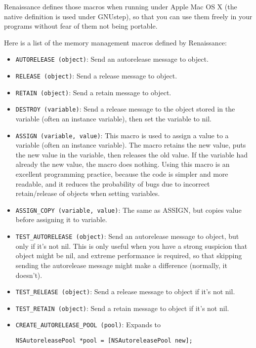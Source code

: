 Renaissance defines those macros when running under Apple Mac OS X
(the native definition is used under GNUstep), so that you can use
them freely in your programs without fear of them not being portable.

Here is a list of the memory management macros defined by Renaissance:
\begin{itemize}
\item \texttt{AUTORELEASE (object)}: Send an autorelease message to object.
\item \texttt{RELEASE (object)}: Send a release message to object.
\item \texttt{RETAIN (object)}: Send a retain message to object.
\item \texttt{DESTROY (variable)}: Send a release message to the object
stored in the variable (often an instance variable), then set the
variable to nil.
\item \texttt{ASSIGN (variable, value)}: This macro is used to assign a 
value to a variable (often an instance variable).  The macro retains
the new value, puts the new value in the variable, then releases the
old value.  If the variable had already the new value, the macro does
nothing.  Using this macro is an excellent programming practice,
because the code is simpler and more readable, and it reduces the
probability of bugs due to incorrect retain/release of objects when
setting variables.
\item \texttt{ASSIGN\_COPY (variable, value)}: The same as ASSIGN, but copies
value before assigning it to variable.
\item \texttt{TEST\_AUTORELEASE (object)}: Send an autorelease message to
object, but only if it's not nil.  This is only useful when you have a
strong suspicion that object might be nil, and extreme performance is
required, so that skipping sending the autorelease message might make
a difference (normally, it doesn't).
\item \texttt{TEST\_RELEASE (object)}: Send a release message to
object if it's not nil.
\item \texttt{TEST\_RETAIN (object)}: Send a retain message to
object if it's not nil.
\item \texttt{CREATE\_AUTORELEASE\_POOL (pool)}: Expands to
\begin{verbatim}
NSAutoreleasePool *pool = [NSAutoreleasePool new];
\end{verbatim}
\end{itemize}

